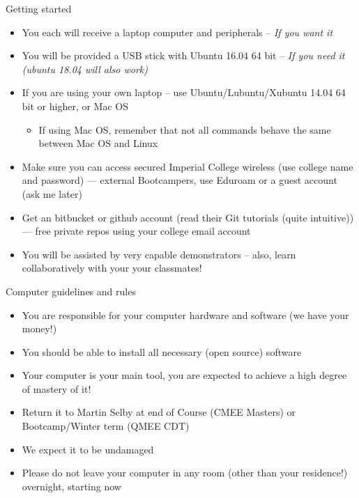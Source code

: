\documentclass[xcolor={usenames,x11names},compress]{beamer}
\renewcommand{\(}{\begin{columns}}
\renewcommand{\)}{\end{columns}}
\newcommand{\<}[1]{\begin{column}{#1}}
\renewcommand{\>}{\end{column}}
\begin{document}
\begin{frame}{Getting started}
  
  \begin{itemize}\setlength{\itemindent}{0em}\itemsep6pt
    \item You each will receive a laptop computer and peripherals -- {\it If you want it}  
    \item You will be provided a USB stick with Ubuntu 16.04 64 bit -- {\it If you need it (ubuntu 18.04 will also work)}
    \item If you are using your own laptop -- use Ubuntu/Lubuntu/Xubuntu 14.04 64 bit or higher, or Mac OS
    \begin{itemize}
	    \item If using Mac OS, remember that not all commands behave the same between Mac OS and Linux 
		\end{itemize}
    
		\item Make sure you can access secured Imperial College wireless (use college name and password) --- external Bootcampers, use Eduroam or a guest account (ask me later) 
    \item Get an bitbucket or github account (read their Git tutorials (quite intuitive)) --- free private repos using your college email account
     \item You will be assisted by very capable demonstrators -- also, learn collaboratively with your your classmates!
  
\end{itemize}  
 
  \end{frame}

\begin{frame}{Computer guidelines and rules}
  
  \begin{itemize}\setlength{\itemindent}{0em}\itemsep6pt
    \item You are responsible for your computer hardware and software (we have your money!)
    \item You should be able to install all necessary (open source) software
    \item Your computer is your main tool, you are expected to achieve a high
degree of mastery of it!
    \item Return it to Martin Selby at end of Course (CMEE Masters) or Bootcamp/Winter term (QMEE CDT)
    \item We expect it to be undamaged
  \item Please do not leave your computer in any room (other than your
residence!) overnight, starting now
 \end{itemize}  
  \end{frame}
\end{document}
